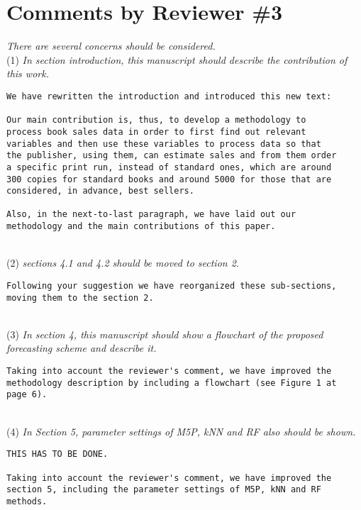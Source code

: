 \documentclass[preprint]{elsarticle}
\begin{document}
\section{Comments by Reviewer \#3}

\noindent \emph{There are several concerns should be considered.}\\

\noindent (1) \emph{In section introduction, this manuscript should describe the contribution of this work. } 

\begin{verbatim}
We have rewritten the introduction and introduced this new text:

Our main contribution is, thus, to develop a methodology to 
process book sales data in order to first find out relevant 
variables and then use these variables to process data so that 
the publisher, using them, can estimate sales and from them order 
a specific print run, instead of standard ones, which are around 
300 copies for standard books and around 5000 for those that are 
considered, in advance, best sellers.

Also, in the next-to-last paragraph, we have laid out our 
methodology and the main contributions of this paper.
\end{verbatim}

~\\
\noindent (2) \emph{sections 4.1 and 4.2 should be moved to section 2. } 

\begin{verbatim}
Following your suggestion we have reorganized these sub-sections, 
moving them to the section 2.
\end{verbatim}

~\\
\noindent (3) \emph{In section 4, this manuscript should show a flowchart of the proposed forecasting scheme and describe it. } 

\begin{verbatim}
Taking into account the reviewer's comment, we have improved the 
methodology description by including a flowchart (see Figure 1 at 
page 6).
\end{verbatim}

~\\
\noindent (4) \emph{In Section 5, parameter settings of M5P, kNN and RF also should be shown. } 

\begin{verbatim}
THIS HAS TO BE DONE.

Taking into account the reviewer's comment, we have improved the 
section 5, including the parameter settings of M5P, kNN and RF 
methods.
\end{verbatim}
\end{document}
